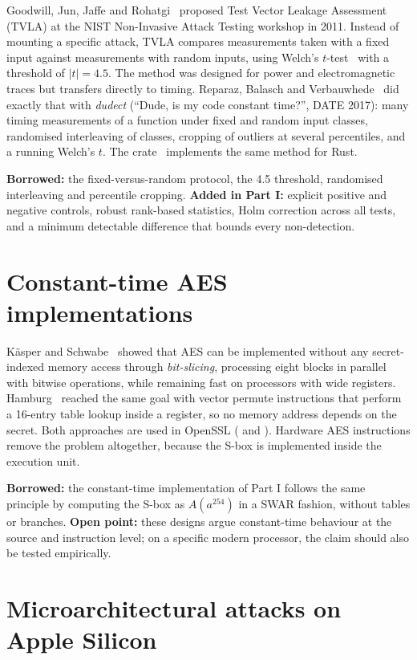 Goodwill, Jun, Jaffe and Rohatgi~\cite{tvla} proposed Test Vector Leakage Assessment (TVLA) at the NIST Non-Invasive Attack Testing workshop in 2011. Instead of mounting a specific attack, TVLA compares measurements taken with a fixed input against measurements with random inputs, using Welch's $t$-test~\cite{welch47} with a threshold of $\lvert t\rvert = 4.5$. The method was designed for power and electromagnetic traces but transfers directly to timing. Reparaz, Balasch and Verbauwhede~\cite{dudect} did exactly that with \emph{dudect} (``Dude, is my code constant time?'', DATE 2017): many timing measurements of a function under fixed and random input classes, randomised interleaving of classes, cropping of outliers at several percentiles, and a running Welch's $t$. The  crate~\cite{dudectbencher} implements the same method for Rust.

\textbf{Borrowed:} the fixed-versus-random protocol, the 4.5 threshold, randomised interleaving and percentile cropping. \textbf{Added in Part I:} explicit positive and negative controls, robust rank-based statistics, Holm correction across all tests, and a minimum detectable difference that bounds every non-detection.

\section{Constant-time AES implementations}
\label{sec:lit_ctaes}

Käsper and Schwabe~\cite{kasper09} showed that AES can be implemented without any secret-indexed memory access through \emph{bit-slicing}, processing eight blocks in parallel with bitwise operations, while remaining fast on processors with wide registers. Hamburg~\cite{hamburg09} reached the same goal with vector permute instructions that perform a 16-entry table lookup inside a register, so no memory address depends on the secret. Both approaches are used in OpenSSL ( and ). Hardware AES instructions remove the problem altogether, because the S-box is implemented inside the execution unit.

\textbf{Borrowed:} the constant-time implementation of Part I follows the same principle by computing the S-box as $A(a^{254})$ in a SWAR fashion, without tables or branches. \textbf{Open point:} these designs argue constant-time behaviour at the source and instruction level; on a specific modern processor, the claim should also be tested empirically.

\section{Microarchitectural attacks on Apple Silicon}
\label{sec:lit_apple}


